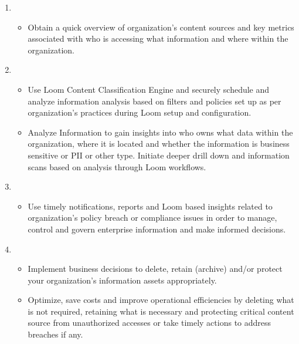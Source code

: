 \documentclass[letterpaper,10pt,english]{sphinxmanual}
\begin{document}
\begin{enumerate}
\begin{itemize}
\end{itemize}

\item {} 
\begin{itemize}
\item {} 
Obtain a quick overview of organization’s content sources and key metrics associated with who is accessing what information and where within the organization.

\end{itemize}

\item {} 
\begin{itemize}
\item {} 
Use Loom Content Classification Engine and securely schedule and analyze information analysis based on filters and policies set up as per organization’s practices during Loom setup and configuration.

\item {} 
Analyze Information to gain insights into who owns what data within the organization, where it is located and whether the information is business sensitive or PII or other type. Initiate deeper drill down and information scans based on analysis through Loom workflows.

\end{itemize}

\item {} 
\begin{itemize}
\item {} 
Use timely notifications, reports and Loom based insights related to organization’s policy breach or compliance issues in order to manage, control and govern enterprise information and make informed decisions.

\end{itemize}

\item {} 
\begin{itemize}
\item {} 
Implement business decisions to delete, retain (archive) and/or protect your organization’s information assets appropriately.

\item {} 
Optimize, save costs and improve operational efficiencies by deleting what is not required, retaining what is necessary and protecting critical content source from unauthorized accesses or take timely actions to address breaches if any.


\end{itemize}
\end{enumerate}
\end{document}
